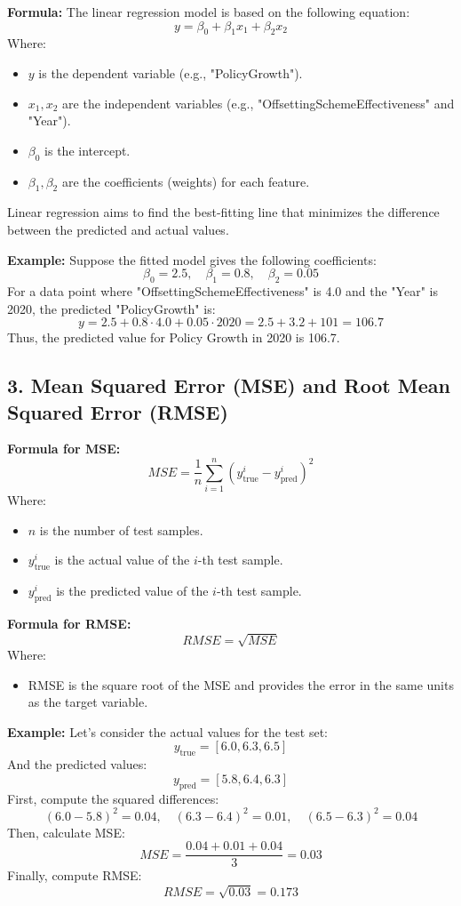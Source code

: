 \documentclass[12pt]{article}
\begin{document}
\textbf{Formula:}  
The linear regression model is based on the following equation:
\[
y = \beta_0 + \beta_1 x_1 + \beta_2 x_2
\]
Where:
\begin{itemize}
    \item \( y \) is the dependent variable (e.g., "PolicyGrowth").
    \item \( x_1, x_2 \) are the independent variables (e.g., "OffsettingSchemeEffectiveness" and "Year").
    \item \( \beta_0 \) is the intercept.
    \item \( \beta_1, \beta_2 \) are the coefficients (weights) for each feature.
\end{itemize}

Linear regression aims to find the best-fitting line that minimizes the difference between the predicted and actual values.

\textbf{Example:}  
Suppose the fitted model gives the following coefficients:
\[
\beta_0 = 2.5, \quad \beta_1 = 0.8, \quad \beta_2 = 0.05
\]
For a data point where "OffsettingSchemeEffectiveness" is 4.0 and the "Year" is 2020, the predicted "PolicyGrowth" is:
\[
y = 2.5 + 0.8 \cdot 4.0 + 0.05 \cdot 2020 = 2.5 + 3.2 + 101 = 106.7
\]
Thus, the predicted value for Policy Growth in 2020 is 106.7.

\subsection*{3. Mean Squared Error (MSE) and Root Mean Squared Error (RMSE)}

\textbf{Formula for MSE:}  
\[
MSE = \frac{1}{n} \sum_{i=1}^{n} (y_{\text{true}}^i - y_{\text{pred}}^i)^2
\]
Where:
\begin{itemize}
    \item \( n \) is the number of test samples.
    \item \( y_{\text{true}}^i \) is the actual value of the \(i\)-th test sample.
    \item \( y_{\text{pred}}^i \) is the predicted value of the \(i\)-th test sample.
\end{itemize}

\textbf{Formula for RMSE:}  
\[
RMSE = \sqrt{MSE}
\]
Where:
\begin{itemize}
    \item RMSE is the square root of the MSE and provides the error in the same units as the target variable.
\end{itemize}

\textbf{Example:}  
Let’s consider the actual values for the test set:
\[
y_{\text{true}} = [6.0, 6.3, 6.5]
\]
And the predicted values:
\[
y_{\text{pred}} = [5.8, 6.4, 6.3]
\]
First, compute the squared differences:
\[
(6.0 - 5.8)^2 = 0.04, \quad (6.3 - 6.4)^2 = 0.01, \quad (6.5 - 6.3)^2 = 0.04
\]
Then, calculate MSE:
\[
MSE = \frac{0.04 + 0.01 + 0.04}{3} = 0.03
\]
Finally, compute RMSE:
\[
RMSE = \sqrt{0.03} = 0.173
\]
\end{document}
